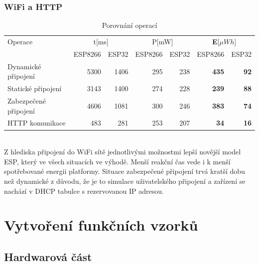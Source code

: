 \documentclass[a4paper, 12pt]{report}
\begin{document}
    \subsection{WiFi a HTTP}
    \begin{table}[h]
        \centering
        \caption{Porovnání operací}
        \begin{tabular}{||l| r r r r |r r||}
            \hline
            Operace & \multicolumn{2}{c}{t[ms]} & \multicolumn{2}{c}{P[mW]} & \multicolumn{2}{c||}{\textbf{E}[$\mu Wh$]} \\
            & ESP8266 & ESP32 & ESP8266 & ESP32 & ESP8266 & ESP32 \\
            \hline
            \hline
            Dynamické připojení   & 5300  & 1406    & 295  & 238     & \textbf{435}&\textbf{92}          \\
            Statické připojení    & 3143  & 1400    & 274  & 228     & \textbf{239}&\textbf{88}          \\
            Zabezpečené připojení & 4606  & 1081    & 300  & 246     & \textbf{383}&\textbf{74}          \\
            HTTP komunikace       & 483  & 281    & 253   & 207     & \textbf{34}&\textbf{16}          \\
            \hline
        \end{tabular}
        \label{tab:porovnani-spotreba-operaci}
    \end{table}\\
    Z hlediska připojení do WiFi sítě jednotlivými možnostmi lepší novější model ESP, který ve všech situacích ve výhodě.
    Menší reakční čas vede i k menší spotřebované energii platformy.
    Situace zabezpečené připojení trvá kratší dobu než dynamické z důvodu, že je to simulace uživatelského připojení a zařízení se nachází v DHCP tabulce s rezervovanou IP adresou.






    \chapter{Vytvoření funkčních vzorků}
    \section{Hardwarová část}
\end{document}
